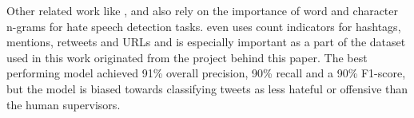 Other related work like \cite{Gaydhani2018}, \cite{Malmasi2017} and \cite{ThomasDavidson2020} also rely on the importance of word and character n-grams for hate speech detection tasks. \cite{ThomasDavidson2020} even uses count indicators for hashtags, mentions, retweets and URLs and is especially important as a part of the dataset used in this work originated from the project behind this paper. The best performing model achieved 91\% overall precision, 90\% recall and a 90\% F1-score, but the model is biased towards classifying tweets as less hateful or offensive than the human supervisors. 
